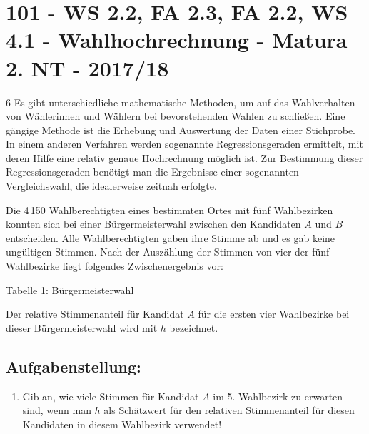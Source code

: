 \section{101 - WS 2.2, FA 2.3, FA 2.2, WS 4.1 - Wahlhochrechnung - Matura 2. NT - 2017/18}

\begin{langesbeispiel} \item[6] %
Es gibt unterschiedliche mathematische Methoden, um auf das Wahlverhalten von Wählerinnen und Wählern bei bevorstehenden Wahlen zu schließen. Eine gängige Methode ist die Erhebung und Auswertung der Daten einer Stichprobe. In einem anderen Verfahren werden sogenannte Regressionsgeraden ermittelt, mit deren Hilfe eine relativ genaue Hochrechnung möglich ist. Zur Bestimmung dieser Regressionsgeraden benötigt man die Ergebnisse einer sogenannten Vergleichswahl, die idealerweise zeitnah erfolgte.

Die 4\,150 Wahlberechtigten eines bestimmten Ortes mit fünf Wahlbezirken konnten sich bei einer Bürgermeisterwahl zwischen den Kandidaten $A$ und $B$ entscheiden. Alle Wahlberechtigten gaben ihre Stimme ab und es gab keine ungültigen Stimmen. Nach der Auszählung der Stimmen von vier der fünf Wahlbezirke liegt folgendes Zwischenergebnis vor:

Tabelle 1: Bürgermeisterwahl


Der relative Stimmenanteil für Kandidat $A$ für die ersten vier Wahlbezirke bei dieser Bürgermeisterwahl wird mit $h$ bezeichnet.

\subsection{Aufgabenstellung:}
\begin{enumerate}
	\item {} Gib an, wie viele Stimmen für Kandidat $A$ im 5. Wahlbezirk zu erwarten sind, wenn man $h$ als Schätzwert für den relativen Stimmenanteil für diesen Kandidaten in diesem Wahlbezirk verwendet!
	

\end{enumerate}
\end{langesbeispiel}
